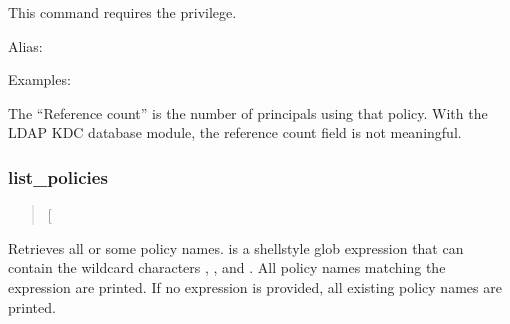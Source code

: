 \documentclass[letterpaper,10pt,english]{sphinxmanual}
\begin{document}
\sphinxAtStartPar
This command requires the  privilege.

\sphinxAtStartPar
Alias: 

\sphinxAtStartPar
Examples:

\begin{sphinxVerbatim}[commandchars=\\\{\}]
  
 
     
   
   
      
     
  

   
                       
\end{sphinxVerbatim}

\sphinxAtStartPar
The “Reference count” is the number of principals using that policy.
With the LDAP KDC database module, the reference count field is not
meaningful.


\subsubsection{list\_policies}
\label{\detokenize{admin/admin_commands/kadmin_local:list-policies}}\label{\detokenize{admin/admin_commands/kadmin_local:id17}}\begin{quote}

\sphinxAtStartPar
{} {[}\sphinxstyleemphasis{expression}{]}
\end{quote}

\sphinxAtStartPar
Retrieves all or some policy names.   is a shell\sphinxhyphen{}style
glob expression that can contain the wild\sphinxhyphen{}card characters ,
\sphinxcode{\sphinxupquote{*}}, and \sphinxcode{\sphinxupquote{{[}{]}}}.  All policy names matching the expression are
printed.  If no expression is provided, all existing policy names are
printed.
\end{document}
